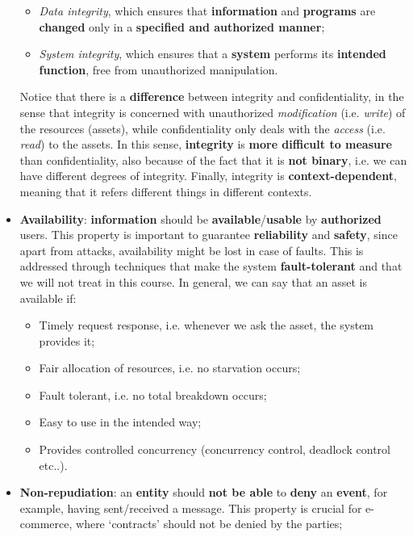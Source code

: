 \begin{itemize}
    \begin{itemize}
        \item \textit{Data integrity}, which ensures that \textbf{information} and \textbf{programs} are \textbf{changed} only in a \textbf{specified and authorized manner};
        \item \textit{System integrity}, which ensures that a \textbf{system} performs its \textbf{intended function}, free from unauthorized manipulation.
    \end{itemize}

    Notice that there is a \textbf{difference} between integrity and confidentiality, in the sense that integrity is concerned with unauthorized \textit{modification} (i.e. \textit{write}) of the resources (assets), while confidentiality only deals with the \textit{access} (i.e. \textit{read}) to the assets. In this sense, \textbf{integrity} is \textbf{more difficult to measure} than confidentiality, also because of the fact that it is \textbf{not binary}, i.e. we can have different degrees of integrity. Finally, integrity is \textbf{context-dependent}, meaning that it refers different things in different contexts. 


    \item \textbf{Availability}: \textbf{information} should be \textbf{available}/\textbf{usable} by \textbf{authorized} users. This property is important to guarantee \textbf{reliability} and \textbf{safety}, since apart from attacks, availability might be lost in case of faults. This is addressed through techniques that make the system \textbf{fault-tolerant} and that we will not treat in this course. In general, we can say that an asset is available if:

    \begin{itemize}
        \item Timely request response, i.e. whenever we ask the asset, the system provides it;
        \item Fair allocation of resources, i.e. no starvation occurs;
        \item Fault tolerant, i.e. no total breakdown occurs;
        \item Easy to use in the intended way;
        \item Provides controlled concurrency (concurrency control, deadlock control etc..).
    \end{itemize}
    
    \item \textbf{Non-repudiation}: an \textbf{entity} should \textbf{not be able} to \textbf{deny} an \textbf{event}, for example, having sent/received a message. This property is crucial for e-commerce, where ‘contracts’ should not be denied by the parties;
    
\end{itemize}

